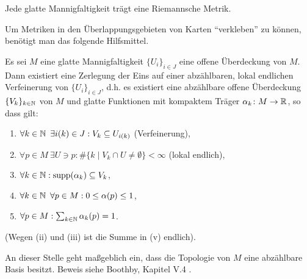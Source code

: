 \begin{Satz}\label{Satz-6-3}
  Jede glatte Mannigfaltigkeit trägt eine Riemannsche Metrik.
\end{Satz}

Um Metriken in den Überlappungsgebieten von Karten "`verkleben"' zu können, benötigt man das folgende Hilfsmittel.

\begin{satz}
  Es sei $M$ eine glatte Mannigfaltigkeit $\{U_i\}_{i \in J}$ eine offene Überdeckung von $M$.
  Dann existiert eine Zerlegung der Eins auf einer abzählbaren, lokal endlichen Verfeinerung von $\{U_i\}_{i \in J}$, d.h. es existiert eine abzählbare offene Überdeckung $\{V_k\}_{k\in\operatorname{\mathbb{N}}}$ von $M$ und glatte Funktionen mit kompaktem Träger $\alpha_k \colon M \to \operatorname{\mathbb{R}}$, so dass gilt:

  \begin{enumerate}[label=(\roman*)]
  \item $\forall k \in \operatorname{\mathbb{N}} \ \exists i(k) \in J: V_k \subseteq U_{i(k)}$ (Verfeinerung),
  \item $\forall p \in M \ \exists U \ni p: \# \{k \mid V_k \cap U \neq \emptyset \} < \infty$ (lokal endlich),
  \item $\forall k \in \operatorname{\mathbb{N}}: \operatorname{supp} (\alpha_k) \subseteq V_k$,
  \item $\forall k \in \operatorname{\mathbb{N}} \ \forall p \in M: 0 \leq \alpha(p) \leq 1$,
  \item $\forall p \in M: \sum_{k\in\operatorname{\mathbb{N}}}\alpha_k(p) = 1$.
  \end{enumerate}
  (Wegen (ii) und (iii) ist die Summe in (v) endlich).
\end{satz}
An dieser Stelle geht maßgeblich ein, dass die Topologie von $M$ eine abzählbare Basis besitzt. Beweis siehe Boothby, Kapitel V.4 \cite{boothby1986introduction}.

